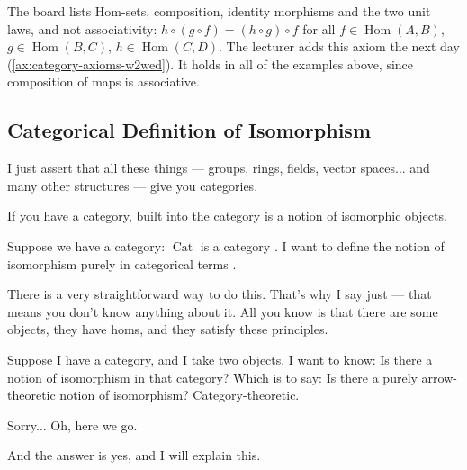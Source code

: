 \begin{aiNote}
The board lists Hom-sets, composition, identity morphisms and the two unit laws, and not associativity: $h \circ (g \circ f) = (h \circ g) \circ f$ for all $f \in \operatorname{Hom}(A, B)$, $g \in \operatorname{Hom}(B, C)$, $h \in \operatorname{Hom}(C, D)$. The lecturer adds this axiom the next day (\cref{ax:category-axioms-w2wed}). It holds in all of the examples above, since composition of maps is associative.
\end{aiNote}

\subsection{Categorical Definition of Isomorphism}

\begin{speech}[01:17:26 - 01:19:18]
I just assert that all these things --- groups, rings, fields, vector spaces...  and many other structures --- give you categories.

If you have a category, built into the category is a notion of isomorphic objects.

Suppose we have a category: $\operatorname{Cat}$ is a category . I want to define the notion of isomorphism purely in categorical terms .

There is a very straightforward way to do this. That's why I say just  --- that means you don't know anything about it. All you know is that there are some objects, they have homs, and they satisfy these principles.

Suppose I have a category, and I take two objects. I want to know: Is there a notion of isomorphism in that category? Which is to say: Is there a purely arrow-theoretic notion of isomorphism? Category-theoretic.

Sorry...  Oh, here we go.

And the answer is yes, and I will explain this.
\end{speech}

\begin{hidden}
\end{hidden}

